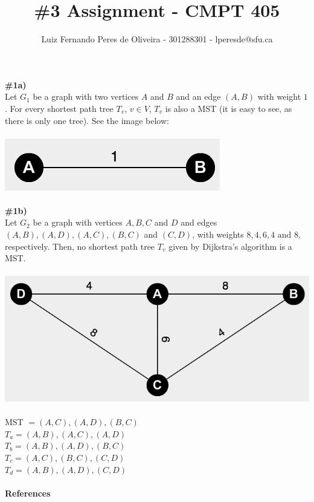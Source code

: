 \documentclass{article}
\title{\#3 Assignment - CMPT 405}
\author{Luiz Fernando Peres de Oliveira - 301288301 - lperesde@sfu.ca}
\begin{document}
\maketitle
\textbf{\#1a)}
\\
Let $G_1$ be a graph with two vertices $A$ and $B$ and an edge $(A, B)$ with weight $1$. For every shortest path tree $T_v$, $v \in V$, $T_v$ is also a MST (it is easy to see, as there is only one tree). See the image below:
\\
\\
\includegraphics[scale=0.6]{simple_graph_hw3}
\\
\\
\textbf{\#1b)}
\\
Let $G_2$ be a graph with vertices $A, B, C$ and $D$ and edges $(A, B), (A, D), (A,C), (B,C)$ and $(C,D)$, with weights $8, 4, 6, 4 \text{ and } 8$, respectively. Then, no shortest path tree $T_v$ given by Dijkstra's algorithm is a MST.
\\
\\
\includegraphics[scale=0.4]{complex_graph_hw3}
\\
\\
MST $= (A,C), (A,D), (B,C)$
\\
$T_a = (A, B), (A, C), (A, D)$
\\
$T_b = (A, B), (A, D), (B, C)$
\\
$T_c = (A, C), (B, C), (C, D)$
\\
$T_d = (A, B), (A, D), (C, D)$
\\
\\
\textbf{References}
\\
\end{document}
